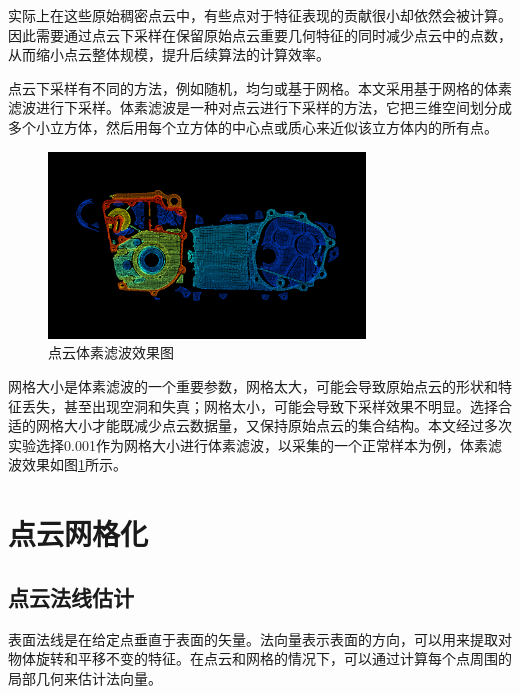 实际上在这些原始稠密点云中，有些点对于特征表现的贡献很小却依然会被计算。因此需要通过点云下采样在保留原始点云重要几何特征的同时减少点云中的点数，从而缩小点云整体规模，提升后续算法的计算效率。

点云下采样有不同的方法，例如随机，均匀或基于网格。本文采用基于网格的体素滤波进行下采样。体素滤波是一种对点云进行下采样的方法，它把三维空间划分成多个小立方体，然后用每个立方体的中心点或质心来近似该立方体内的所有点。
\begin{figure}[htbp]
    \centering
    \includegraphics[width=0.75\textwidth]{figures/after_down.png}
    \caption{点云体素滤波效果图}
    \label{fig:aftet_down}
\end{figure}

网格大小是体素滤波的一个重要参数，网格太大，可能会导致原始点云的形状和特征丢失，甚至出现空洞和失真；网格太小，可能会导致下采样效果不明显。选择合适的网格大小才能既减少点云数据量，又保持原始点云的集合结构。本文经过多次实验选择0.001作为网格大小进行体素滤波，以采集的一个正常样本为例，体素滤波效果如图\ref{fig:aftet_down}所示。



\section{点云网格化}
\subsection{点云法线估计}
表面法线是在给定点垂直于表面的矢量。法向量表示表面的方向，可以用来提取对物体旋转和平移不变的特征。在点云和网格的情况下，可以通过计算每个点周围的局部几何来估计法向量。

